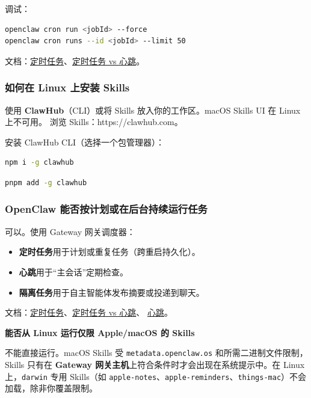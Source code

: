 调试：

\begin{lstlisting}[language=bash]
openclaw cron run <jobId> --force
openclaw cron runs --id <jobId> --limit 50
\end{lstlisting}


文档：\href{/automation/cron-jobs}{定时任务}、\href{/automation/cron-vs-heartbeat}{定时任务 vs 心跳}。

\subsubsection{如何在 Linux 上安装 Skills}


使用 \textbf{ClawHub}（CLI）或将 Skills 放入你的工作区。macOS Skills UI 在 Linux 上不可用。
浏览 Skills：https://clawhub.com。

安装 ClawHub CLI（选择一个包管理器）：

\begin{lstlisting}[language=bash]
npm i -g clawhub
\end{lstlisting}


\begin{lstlisting}[language=bash]
pnpm add -g clawhub
\end{lstlisting}


\subsubsection{OpenClaw 能否按计划或在后台持续运行任务}


可以。使用 Gateway 网关调度器：

\begin{itemize}
  \item \textbf{定时任务}用于计划或重复任务（跨重启持久化）。
  \item \textbf{心跳}用于“主会话”定期检查。
  \item \textbf{隔离任务}用于自主智能体发布摘要或投递到聊天。
\end{itemize}


文档：\href{/automation/cron-jobs}{定时任务}、\href{/automation/cron-vs-heartbeat}{定时任务 vs 心跳}、
\href{/gateway/heartbeat}{心跳}。

\textbf{能否从 Linux 运行仅限 Apple/macOS 的 Skills}

不能直接运行。macOS Skills 受 \texttt{metadata.openclaw.os} 和所需二进制文件限制，Skills 只有在 \textbf{Gateway 网关主机}上符合条件时才会出现在系统提示中。在 Linux 上，\texttt{darwin} 专用 Skills（如 \texttt{apple-notes}、\texttt{apple-reminders}、\texttt{things-mac}）不会加载，除非你覆盖限制。

